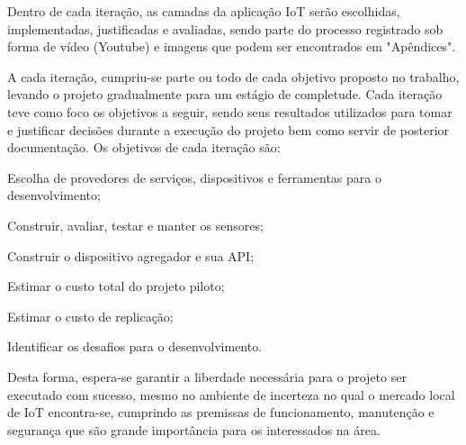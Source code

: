 Dentro de cada iteração, as camadas da aplicação IoT serão escolhidas,
implementadas, justificadas e avaliadas, sendo parte do processo registrado sob forma de
vídeo (Youtube) e imagens que podem ser encontrados em "Apêndices".

A cada iteração, cumpriu-se parte ou todo de cada objetivo proposto no trabalho,
levando o projeto gradualmente para um estágio de completude.
Cada iteração teve como foco os objetivos a seguir, sendo seus resultados
utilizados para tomar e justificar decisões durante a execução do
projeto bem como servir de posterior documentação. Os objetivos de cada iteração
são:

\begin{alineas}

	\item Escolha de provedores de serviços, dispositivos e ferramentas para o
desenvolvimento;

	\item Construir, avaliar, testar e manter os sensores;

	\item Construir o dispositivo agregador e sua API;

	\item Estimar o custo total do projeto piloto;

	\item Estimar o custo de replicação;

	\item Identificar os desafios para o desenvolvimento.

\end{alineas}

Desta forma, espera-se garantir a liberdade necessária para o projeto ser
executado com sucesso, mesmo no ambiente de incerteza no qual o mercado local de
IoT encontra-se, cumprindo as premissas de funcionamento, manutenção e
segurança que são grande importância para os interessados na área.
